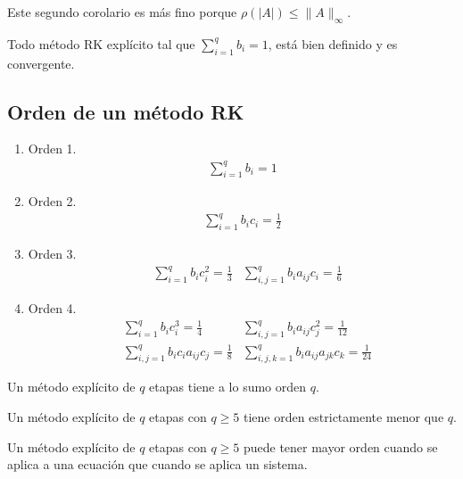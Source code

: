 \begin{obs}
    Este segundo corolario es más fino porque $\rho(|A|) \leq \|A\|_{\infty}$.
\end{obs}

\begin{cor}
    Todo método RK explícito tal que $\sum_{i=1}^{q} b_i = 1$, está bien definido y es convergente.
\end{cor}

\subsection{Orden de un método RK}
\begin{enumerate}
    \item Orden 1.
          \begin{align*}
              \sum_{i=1}^{q} b_i = 1
          \end{align*}
    \item Orden 2.
          \begin{align*}
              \sum_{i=1}^{q} b_ic_i = \frac{1}{2}
          \end{align*}
    \item Orden 3.
          \begin{align*}
               & \sum_{i=1}^{q} b_ic_i^2 = \frac{1}{3}
               & \sum_{i,j=1}^{q} b_ia_{ij}c_i = \frac{1}{6}
          \end{align*}
    \item Orden 4.
          \begin{align*}
               & \sum_{i=1}^{q} b_ic_i^3 = \frac{1}{4}
               & \sum_{i,j=1}^{q} b_ia_{ij}c_j^2 = \frac{1}{12}       \\
               & \sum_{i,j=1}^{q} b_ic_ia_{ij}c_j = \frac{1}{8}
               & \sum_{i,j,k=1}^{q} b_ia_{ij}a_{jk}c_k = \frac{1}{24}
          \end{align*}
\end{enumerate}

\begin{teo}
    Un método explícito de $q$ etapas tiene a lo sumo orden $q$.
\end{teo}

\begin{teo}
    Un método explícito de $q$ etapas con $q \ge 5$ tiene orden estrictamente menor que $q$.
\end{teo}

\begin{teo}
    Un método explícito de $q$ etapas con $q \ge 5$ puede tener mayor orden cuando se aplica a una ecuación que cuando se aplica un sistema.
\end{teo}

